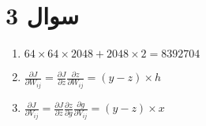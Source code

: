 \section*{سوال 3}
\begin{enumerate}
    \item $64 \times 64 \times 2048 + 2048 \times 2 = 8392704$
    \item $\frac{\partial J}{\partial W_{ij}} = \frac{\partial J}{\partial z}\frac{\partial z}{\partial W_{ij}} = (y - z) \times h$
    \item $\frac{\partial J}{\partial V_{ij}} = \frac{\partial J}{\partial z}\frac{\partial z}{\partial g}\frac{\partial g}{\partial V_{ij}} = (y - z) \times x$
\end{enumerate}